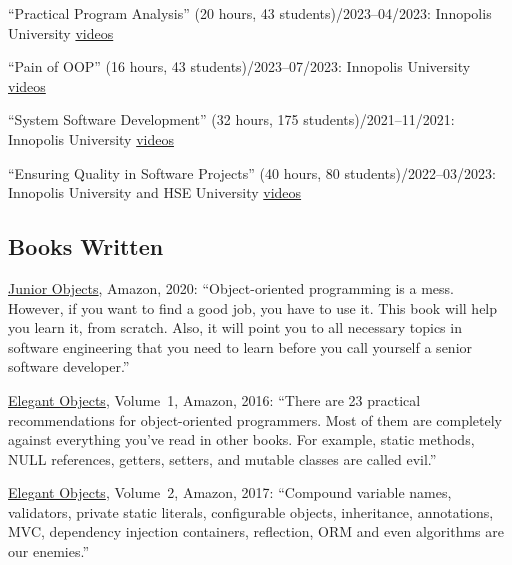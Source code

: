 \documentclass{vl}
\begin{document}
    ``Practical Program Analysis'' (20 hours, 43 students)/2023--04/2023: Innopolis University\newline
    \href{https://www.youtube.com/playlist?list=PLaIsQH4uc08wdXIC4utfgMxV_iswE9_Md}{videos}

    ``Pain of OOP'' (16 hours, 43 students)/2023--07/2023: Innopolis University\newline
    \href{https://www.youtube.com/playlist?list=PLaIsQH4uc08ytf8POIIAkkR4ZsRq8DFiV}{videos}

    ``System Software Development'' (32 hours, 175 students)/2021--11/2021: Innopolis University\newline
    \href{https://www.youtube.com/playlist?list=PLaIsQH4uc08woJKRAA7mmjs9fU0jeKjjM}{videos}

    ``Ensuring Quality in Software Projects'' (40 hours, 80 students)/2022--03/2023: Innopolis University and HSE University\newline
    \href{https://www.youtube.com/playlist?list=PLaIsQH4uc08y14wCJMeffS2yErN4QpB8m}{videos}

    \subsection*{Books Written}

    \href{https://amzn.to/2u9BbqF}{Junior Objects}, Amazon, 2020:
    ``Object-oriented programming is a mess. However,
    if you want to find a good job, you have to use it.
    This book will help you learn it, from scratch.
    Also, it will point you to all necessary topics
    in software engineering that you need to learn before
    you call yourself a senior software developer.''

    \href{https://amzn.to/2E5UHqZ}{Elegant Objects}, Volume~1, Amazon, 2016:
    ``There are 23 practical recommendations for object-oriented programmers. Most of them are completely
    against everything you've read in other books.
    For example, static methods, NULL references, getters, setters, and
    mutable classes are called evil.''

    \href{https://amzn.to/2J2s5T4}{Elegant Objects}, Volume~2, Amazon, 2017:
    ``Compound variable names, validators, private static literals, configurable objects, inheritance,
    annotations, MVC, dependency injection containers, reflection, ORM and even algorithms are our enemies.''
\end{document}
